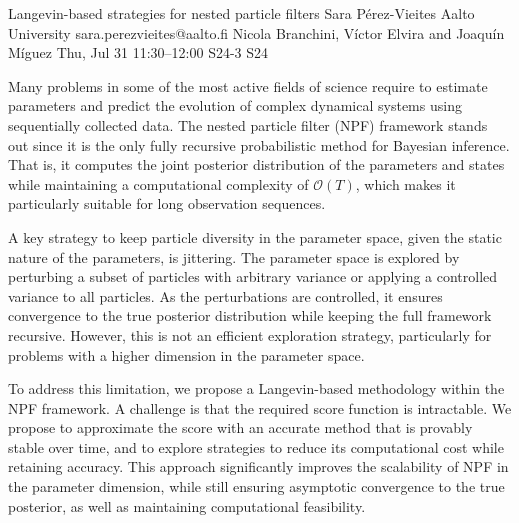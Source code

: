 \documentclass[12pt,lettersize,oneside]{book} %
\begin{document}
\begin{talk}
  {Langevin-based strategies for nested particle filters}%
  {Sara P\'erez-Vieites}%
  {Aalto University}%
  {sara.perezvieites@aalto.fi}%
  {Nicola Branchini, V\'ictor Elvira and Joaqu\'in M\'iguez}%
  {}%
  {Thu, Jul 31 11:30--12:00}%
  {S24-3}%
  {S24}%
  
    
   
Many problems in some of the most active fields of science require to estimate parameters and predict the evolution of complex dynamical systems using sequentially collected data. The nested particle filter (NPF) framework stands out since it is the only fully recursive probabilistic method for Bayesian inference. That is, it computes the joint posterior distribution of the parameters and states while maintaining a computational complexity of $\mathcal{O}(T)$, which makes it particularly suitable for long observation sequences. 

A key strategy to keep particle diversity in the parameter space, given the static nature of the parameters, is jittering. The parameter space is explored by perturbing a subset of particles with arbitrary variance or applying a controlled variance to all particles. As the perturbations are controlled, it ensures convergence to the true posterior distribution while keeping the full framework recursive. However, this is not an efficient exploration strategy, particularly for problems with a higher dimension in the parameter space.

To address this limitation, we propose a Langevin-based methodology within the NPF framework. A challenge is that the required score function is intractable. We propose to approximate the score with an accurate method that is provably stable over time, and to explore strategies to reduce its computational cost while retaining accuracy.
This approach significantly improves the scalability of NPF in the parameter dimension, while still ensuring asymptotic convergence to the true posterior, as well as maintaining computational feasibility.

\medskip




\end{talk}
\end{document}
